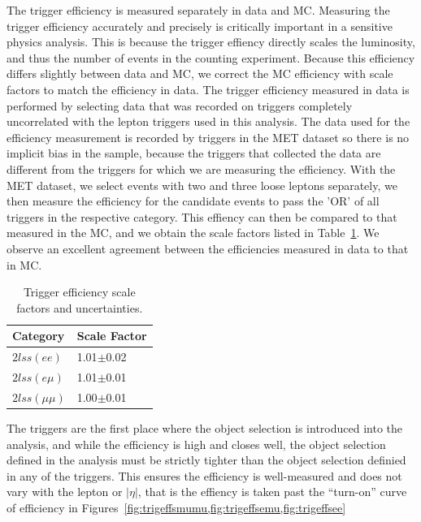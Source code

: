The trigger efficiency is measured separately in data and MC. Measuring the trigger efficiency accurately and precisely is critically
important in a sensitive physics analysis. This is because the trigger effiency directly scales the luminosity, and thus the number
of events in the counting experiment.
Because this efficiency differs slightly between data and MC, we correct the MC efficiency with scale factors to match the
efficiency in data. The trigger efficiency measured in data is performed by selecting data that was recorded on triggers completely
uncorrelated with the lepton triggers used in this analysis. The data used for the efficiency measurement is recorded by triggers in
the MET dataset so there is no implicit bias in the sample, because the triggers that collected the data are different from the triggers
for which we are measuring the efficiency. With the MET dataset, we select events with two and three loose leptons separately, we then measure
the efficiency for the candidate events to pass the 'OR' of all triggers in the respective category. This effiency can then be compared
to that measured in the MC, and we obtain the scale factors listed in Table~\ref{tab:trigger_sf}. We observe an excellent agreement between
the efficiencies measured in data to that in MC. 


\begin{table}[hbtp]
\centering
\caption{Trigger efficiency scale factors and uncertainties.}
\begin{tabular}{l|l}
\hline
Category & Scale Factor \\
\hline
$2lss (ee)$ & 1.01$\pm$0.02 \\
$2lss (e\mu)$ & 1.01$\pm$0.01 \\
$2lss (\mu\mu)$ & 1.00$\pm$0.01 \\
\hline
\end{tabular}
\label{tab:trigger_sf}
\end{table}

The triggers are the first place where the object selection is introduced into the analysis, and while the efficiency is high and closes well,
the object selection defined in the analysis must be strictly tighter than the object selection definied in any of the triggers. This ensures
the efficiency is well-measured and does not vary with the lepton \pt or $|\eta|$, that is the effiency is taken past the ``turn-on'' curve
of efficiency in Figures~\ref{fig:trigeffsmumu,fig:trigeffsemu,fig:trigeffsee}  

